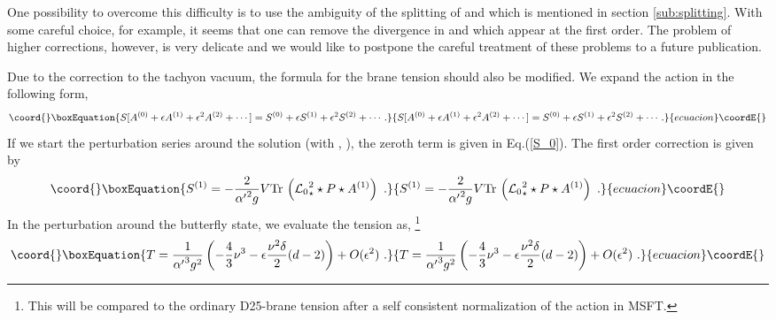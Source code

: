 \documentclass[a4paper,aps,preprint,nofootinbib,eqsecnum]{revtex4}
\begin{document}
One possibility to overcome this difficulty is to use the ambiguity of the
splitting of \coordHE{} and \myHighlight{$\gamma $}\coordHE{} which is mentioned in section
\ref{sub:splitting}.
With some careful choice, for example, it seems that one can remove
the divergence in \myHighlight{$\nu $}\coordHE{} and \myHighlight{$\delta $}\coordHE{} which appear at the first order. The
problem of higher corrections, however, is very delicate and we would like
to postpone the careful treatment of these problems to a future publication.

Due to the correction to the tachyon vacuum, the formula for the brane
tension should also be modified. We expand the action in the following form,
\begin{equation}\coord{}\boxEquation{
S[A^{\left( 0\right) }+\epsilon A^{\left( 1\right) }+\epsilon ^{2}A^{\left(
2\right) }+\cdots ]=S^{\left( 0\right) }+\epsilon S^{\left( 1\right)
}+\epsilon ^{2}S^{\left( 2\right) }+\cdots .
}{
S[A^{\left( 0\right) }+\epsilon A^{\left( 1\right) }+\epsilon ^{2}A^{\left(
2\right) }+\cdots ]=S^{\left( 0\right) }+\epsilon S^{\left( 1\right)
}+\epsilon ^{2}S^{\left( 2\right) }+\cdots .
}{ecuacion}\coordE{}\end{equation}%
If we start the perturbation series around the solution \coordHE{} (with \coordHE{}, \coordHE{}), the zeroth term is
given in Eq.(\ref{S_0}). The first order correction is given by
\begin{equation}\coord{}\boxEquation{
S^{\left( 1\right) }=-\frac{2}{{\alpha ^{\prime }}^2g}
V\mbox{Tr}\,\left( {
\mathcal{L}_{0}}_{\star }^{2}\star P\star A^{\left( 1\right) }\right) \,\,.
}{
S^{\left( 1\right) }=-\frac{2}{{\alpha ^{\prime }}^2g}
V\mbox{Tr}\,\left( {
\mathcal{L}_{0}}_{\star }^{2}\star P\star A^{\left( 1\right) }\right) \,\,.
}{ecuacion}\coordE{}\end{equation}%
In the perturbation around the butterfly state, we evaluate the tension as,%
\footnote{%
This will be compared to the ordinary D25-brane tension after a self
consistent normalization of the action in MSFT\cite{PREP}.}
\begin{equation}\coord{}\boxEquation{
T=\frac{1}{{\alpha ^{\prime }}^{3}g^{2}}\left( -\frac{4}{3}\nu ^{3}-\epsilon
\frac{\nu ^{2}\delta }{2}(d-2)\right) +O(\epsilon ^{2})\,\,.
}{
T=\frac{1}{{\alpha ^{\prime }}^{3}g^{2}}\left( -\frac{4}{3}\nu ^{3}-\epsilon
\frac{\nu ^{2}\delta }{2}(d-2)\right) +O(\epsilon ^{2})\,\,.
}{ecuacion}\coordE{}\end{equation}
\end{document}
